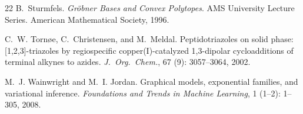 \documentclass[preprint,12pt]{elsarticle}
\theoremstyle{definition}
\theoremstyle{remark}
\begin{document}
\begin{thebibliography}{22}
B.~Sturmfels.
\newblock \emph{{Gr\"obner} Bases and Convex Polytopes}.
\newblock AMS University Lecture Series. American Mathematical Society, 1996.

C.~W. Torn{\o}e, C.~Christensen, and M.~Meldal.
\newblock Peptidotriazoles on solid phase: [1,2,3]-triazoles by regiospecific
  copper({I})-catalyzed 1,3-dipolar cycloadditions of terminal alkynes to
  azides.
\newblock \emph{J.~Org.\ Chem.}, 67 (9): 3057--3064, 2002.

M.~J. Wainwright and M.~I. Jordan.
\newblock Graphical models, exponential families, and variational inference.
\newblock \emph{Foundations and Trends in Machine Learning}, 1
  (1--2): 1--305, 2008.

\end{thebibliography}
\end{document}

